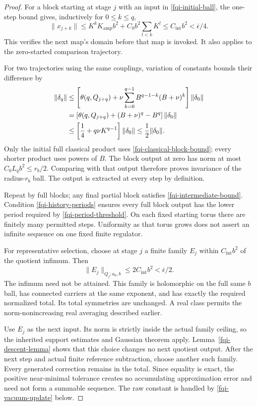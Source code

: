 \documentclass[11pt]{article}
\theoremstyle{remark}
\begin{document}
\begin{proof}
For a block starting at stage $j$ with an input in
\eqref{fqi-initial-ball}, the one-step bound gives, inductively
for $0\le k\le q$,
\begin{equation}
 \|x_{j+k}\|
 \le K^kK_{\mathrm{amp}}b^2+C_0b^2\sum_{l<k}K^l
 \le C_{\mathrm{int}}b^2<\bar\epsilon/4.
 \label{fqi-intermediate-bound}
\end{equation}
This verifies the next map's domain before that map is invoked.
It also applies to the zero-started comparison trajectory.

For two trajectories using the same couplings, variation of
constants bounds their difference by
\begin{align}
 \|\delta_q\|
 &\le\left[\theta(q,Q_{j+q})
       +\nu\sum_{k=0}^{q-1}B^{q-1-k}(B+\nu)^k\right]
                                             \|\delta_0\|\notag\\
 &=\left[\theta(q,Q_{j+q})+(B+\nu)^q-B^q\right]
                                             \|\delta_0\|\notag\\
 &\le\left[\frac14+q\nu K^{q-1}\right]\|\delta_0\|
 \le\frac12\|\delta_0\|.
 \label{fqi-Duhamel}
\end{align}
Only the initial full classical product uses
\eqref{fqi-classical-block-bound}; every shorter product
uses powers of $B$. The block output at zero has norm at
most $C_0L_qb^2\le r_b/2$. Comparing with that output
therefore proves invariance of the radius-$r_b$ ball.
The output is extracted at every step by definition.

Repeat by full blocks; any final partial block satisfies
\eqref{fqi-intermediate-bound}. Condition
\eqref{fqi-history-periods} ensures every full block output
has the lower period required by
\eqref{fqi-period-threshold}. On each fixed starting torus
there are finitely many permitted steps. Uniformity as that
torus grows does not assert an infinite sequence on one
fixed finite regulator.

For representative selection, choose at stage $j$ a finite
family $E_j$ within $C_{\mathrm{int}}b^2$ of the quotient infimum.
Then
\begin{equation}
 \|E_j\|_{Q_j;a_0,b}
        \le2C_{\mathrm{int}}b^2<\bar\epsilon/2.
 \label{fqi-chosen-family}
\end{equation}
The infimum need not be attained. This family is holomorphic
on the full same $b$ ball, has connected carriers at the
same exponent, and has exactly the required normalized total.
Its total symmetries are unchanged. A real class permits the
norm-nonincreasing real averaging described earlier.

Use $E_j$ as the next input. Its norm is strictly inside the
actual family ceiling, so the inherited support estimates
and Gaussian theorem apply. Lemma~\ref{fqi-descent-lemma}
shows that this choice changes no next quotient output.
After the next step and actual finite reference subtraction,
choose another such family. Every generated correction remains
in the total. Since equality is exact, the positive
near-minimal tolerance creates no accumulating approximation
error and need not form a summable sequence. The raw constant
is handled by \eqref{fqi-vacuum-update} below.
\end{proof}
\end{document}
